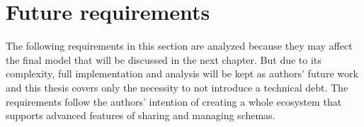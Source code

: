 





\section{Future requirements}\label{chapters:future-requirements}

The following requirements in this section are analyzed because they may affect the final model that will be discussed in the next chapter. But due to its complexity, full implementation and analysis will be kept as authors' future work and this thesis covers only the necessity to not introduce a technical debt. The requirements follow the authors' intention of creating a whole ecosystem that supports advanced features of sharing and managing schemas.









